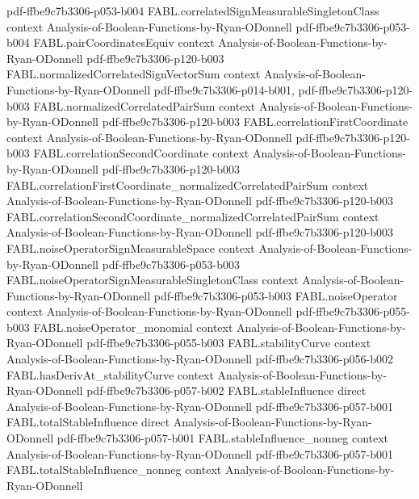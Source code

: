 \begin{theorem}
  {pdf-ffbe9c7b3306-p053-b004}
\proofstep
  {FABL.correlatedSignMeasurableSingletonClass}
  {context}
  {Analysis-of-Boolean-Functions-by-Ryan-ODonnell}
  {pdf-ffbe9c7b3306-p053-b004}
\proofstep
  {FABL.pairCoordinatesEquiv}
  {context}
  {Analysis-of-Boolean-Functions-by-Ryan-ODonnell}
  {pdf-ffbe9c7b3306-p120-b003}
\proofstep
  {FABL.normalizedCorrelatedSignVectorSum}
  {context}
  {Analysis-of-Boolean-Functions-by-Ryan-ODonnell}
  {pdf-ffbe9c7b3306-p014-b001,
    pdf-ffbe9c7b3306-p120-b003}
\proofstep
  {FABL.normalizedCorrelatedPairSum}
  {context}
  {Analysis-of-Boolean-Functions-by-Ryan-ODonnell}
  {pdf-ffbe9c7b3306-p120-b003}
\proofstep
  {FABL.correlationFirstCoordinate}
  {context}
  {Analysis-of-Boolean-Functions-by-Ryan-ODonnell}
  {pdf-ffbe9c7b3306-p120-b003}
\proofstep
  {FABL.correlationSecondCoordinate}
  {context}
  {Analysis-of-Boolean-Functions-by-Ryan-ODonnell}
  {pdf-ffbe9c7b3306-p120-b003}
\proofstep
  {FABL.correlationFirstCoordinate_normalizedCorrelatedPairSum}
  {context}
  {Analysis-of-Boolean-Functions-by-Ryan-ODonnell}
  {pdf-ffbe9c7b3306-p120-b003}
\proofstep
  {FABL.correlationSecondCoordinate_normalizedCorrelatedPairSum}
  {context}
  {Analysis-of-Boolean-Functions-by-Ryan-ODonnell}
  {pdf-ffbe9c7b3306-p120-b003}
\proofstep
  {FABL.noiseOperatorSignMeasurableSpace}
  {context}
  {Analysis-of-Boolean-Functions-by-Ryan-ODonnell}
  {pdf-ffbe9c7b3306-p053-b003}
\proofstep
  {FABL.noiseOperatorSignMeasurableSingletonClass}
  {context}
  {Analysis-of-Boolean-Functions-by-Ryan-ODonnell}
  {pdf-ffbe9c7b3306-p053-b003}
\proofstep
  {FABL.noiseOperator}
  {context}
  {Analysis-of-Boolean-Functions-by-Ryan-ODonnell}
  {pdf-ffbe9c7b3306-p055-b003}
\proofstep
  {FABL.noiseOperator_monomial}
  {context}
  {Analysis-of-Boolean-Functions-by-Ryan-ODonnell}
  {pdf-ffbe9c7b3306-p055-b003}
\proofstep
  {FABL.stabilityCurve}
  {context}
  {Analysis-of-Boolean-Functions-by-Ryan-ODonnell}
  {pdf-ffbe9c7b3306-p056-b002}
\proofstep
  {FABL.hasDerivAt_stabilityCurve}
  {context}
  {Analysis-of-Boolean-Functions-by-Ryan-ODonnell}
  {pdf-ffbe9c7b3306-p057-b002}
\proofstep
  {FABL.stableInfluence}
  {direct}
  {Analysis-of-Boolean-Functions-by-Ryan-ODonnell}
  {pdf-ffbe9c7b3306-p057-b001}
\proofstep
  {FABL.totalStableInfluence}
  {direct}
  {Analysis-of-Boolean-Functions-by-Ryan-ODonnell}
  {pdf-ffbe9c7b3306-p057-b001}
\proofstep
  {FABL.stableInfluence_nonneg}
  {context}
  {Analysis-of-Boolean-Functions-by-Ryan-ODonnell}
  {pdf-ffbe9c7b3306-p057-b001}
\proofstep
  {FABL.totalStableInfluence_nonneg}
  {context}
  {Analysis-of-Boolean-Functions-by-Ryan-ODonnell}

\end{theorem}
